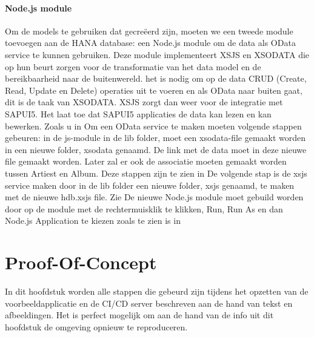             \paragraph{Node.js module}
            Om de models te gebruiken dat gecreëerd zijn, moeten we een tweede module toevoegen aan de HANA database: een Node.js module om de data als OData service te kunnen gebruiken.
            Deze module implementeert XSJS en XSODATA die op hun beurt zorgen voor de transformatie van het data model en de bereikbaarheid naar de buitenwereld. het is nodig om op de data CRUD (Create, Read, Update en Delete) operaties uit te voeren en als OData naar buiten gaat, dit is de taak van XSODATA. XSJS zorgt dan weer voor de integratie met SAPUI5. Het laat toe dat SAPUI5 applicaties de data kan lezen en kan bewerken.
            Zoals u in %
            Om een OData service te maken moeten volgende stappen gebeuren: in de js-module in de lib folder, moet een xsodata-file gemaakt worden in een nieuwe folder, xsodata genaamd. De link met de data moet in deze nieuwe file gemaakt worden. Later zal er ook de associatie moeten gemaakt worden tussen Artiest en Album. Deze stappen zijn te zien in %
            De volgende stap is de xsjs service maken door in de lib folder een nieuwe folder, xsjs genaamd, te maken met de nieuwe hdb.xsjs file. Zie %
            De nieuwe Node.js module moet gebuild worden door op de module met de rechtermuisklik te klikken, Run, Run As en dan Node.js Application te kiezen zoals te zien is in %
    
    
    \section{Proof-Of-Concept}
    \label{sec:proof-of-concept}
    In dit hoofdstuk worden alle stappen die gebeurd zijn tijdens het opzetten van de voorbeeldapplicatie en de CI/CD server beschreven aan de hand van tekst en afbeeldingen. Het is perfect mogelijk om aan de hand van de info uit dit hoofdstuk de omgeving opnieuw te reproduceren.